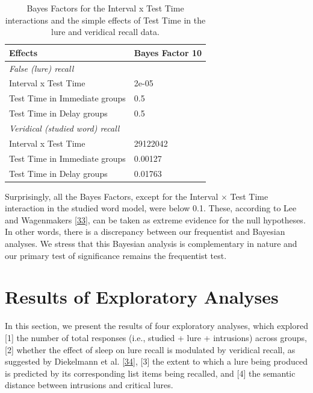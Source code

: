 \documentclass[
]{article}
\begin{document}
\begin{table}[H]

\caption{\label{tab:table5}Bayes Factors for the Interval x Test Time interactions and the simple effects of Test Time in the lure and veridical recall data.}
\centering
\begin{tabular}[t]{ll}
\toprule
Effects & Bayes Factor 10\\
\midrule
\em{False (lure) recall} & \em{}\\
Interval x Test Time & 2e-05\\
Test Time in Immediate groups & 0.5\\
Test Time in Delay groups & 0.5\\
\em{Veridical (studied word) recall} & \em{}\\
\addlinespace
Interval x Test Time & 29122042\\
Test Time in Immediate groups & 0.00127\\
Test Time in Delay groups & 0.01763\\
\bottomrule
\end{tabular}
\end{table}

Surprisingly, all the Bayes Factors, except for the Interval \(\times\) Test Time interaction in the studied word model, were below 0.1. These, according to Lee and Wagenmakers {[}\protect\hyperlink{ref-lee2014a}{33}{]}, can be taken as extreme evidence for the null hypotheses. In other words, there is a discrepancy between our frequentist and Bayesian analyses. We stress that this Bayesian analysis is complementary in nature and our primary test of significance remains the frequentist test.

\hypertarget{results-of-exploratory-analyses}{%
\section{Results of Exploratory Analyses}\label{results-of-exploratory-analyses}}

In this section, we present the results of four exploratory analyses, which explored {[}1{]} the number of total responses (i.e., studied + lure + intrusions) across groups, {[}2{]} whether the effect of sleep on lure recall is modulated by veridical recall, as suggested by Diekelmann et al. {[}\protect\hyperlink{ref-diekelmann2010a}{34}{]}, {[}3{]} the extent to which a lure being produced is predicted by its corresponding list items being recalled, and {[}4{]} the semantic distance between intrusions and critical lures.
\end{document}
